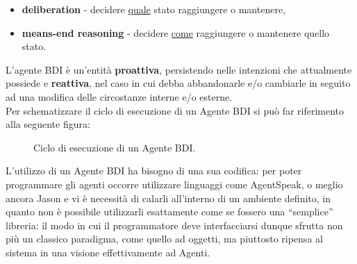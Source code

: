 \documentclass[12pt,a4paper,openright,oneside]{report}
\newcommand{\quotes}[1]{``#1''}
\begin{document}
\begin{itemize}
	\item \textbf{deliberation} - decidere \ul{quale} stato raggiungere o mantenere,
	\item \textbf{means-end reasoning} - decidere \ul{come} raggiungere o mantenere quello stato.
\end{itemize}

L'agente BDI è un'entità \textbf{proattiva}, persistendo nelle intenzioni che attualmente possiede e \textbf{reattiva}, nel caso in cui debba abbandonarle e/o cambiarle in seguito ad una modifica delle circostanze interne e/o esterne.\\

Per schematizzare il ciclo di esecuzione di un Agente BDI si può far riferimento alla seguente figura:

\begin{figure}[h]
	\centering
	\caption{Ciclo di esecuzione di un Agente BDI.}
	\label{fig:jacamo}
\end{figure}

L'utilizzo di un Agente BDI ha bisogno di una sua codifica: per poter programmare gli agenti occorre utilizzare linguaggi come AgentSpeak, o meglio ancora Jason e vi è necessità di calarli all'interno di un ambiente definito, in quanto non è possibile utilizzarli esattamente come se fossero una \quotes{semplice} libreria: il modo in cui il programmatore deve interfacciarsi dunque sfrutta non più un classico paradigma, come quello ad oggetti, ma piuttosto ripensa al sistema in una visione effettivamente ad Agenti.
\end{document}
